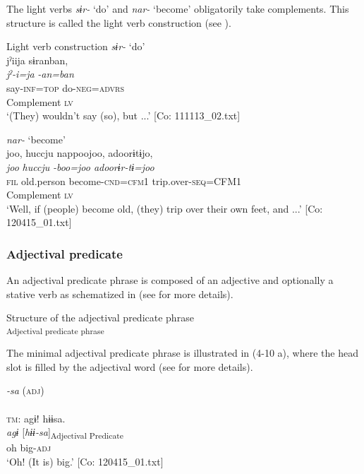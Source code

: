 The light verbs \textit{sɨr-} ‘do’ and \textit{nar-} ‘become’ obligatorily take complements. This structure is called the light verb construction (see ).

\ea  Light verb construction \label{ex:4.8}
 \ea  \textit{sɨr-} ‘do’\\
    \glll jˀiija  sɨranban,\\
    \textit{jˀ-i=ja}  \textit{-an=ban}\\
    say-\textsc{inf}=\textsc{top}  do-\textsc{neg}=\textsc{advrs}\\
    Complement  \textsc{lv}\\
    \glt ‘(They) wouldn’t say (so), but ...’    [Co: 111113\_02.txt]

\ex\textit{nar-} ‘become’\\
\glll joo,  huccju  nappoojoo,  adoorɨtɨjo,\\
    \textit{joo}  \textit{huccju}  \textit{-boo=joo  adoorɨr-tɨ=joo}\\
    \textsc{fil}  old.person  become-\textsc{cnd}=\textsc{cfm}1  trip.over-\textsc{seq}=CFM1\\
      Complement  \textsc{lv}  \\
    \glt ‘Well, if (people) become old, (they) trip over their own feet, and ...’     [Co: 120415\_01.txt]
    \z
\z

\subsubsection{Adjectival predicate}\label{sec:4.1.3.2}

An adjectival predicate phrase is composed of an adjective and optionally a stative verb as schematized in  (see  for more details).

\ea  Structure of the adjectival predicate phrase \label{ex:4.9}\\\textsubscript{Adjectival predicate phrase}
\z

The minimal adjectival predicate phrase is illustrated in (4-10 a), where the head slot is filled by the adjectival word (see  for more details).

\ea   \label{ex:4.10}
\ea \textit{{}-sa} (\textsc{adj}) \label{ex:4.10a}\\\\
\glll  \textsc{tm}:  agɨ!  hɨɨsa.\\
    \textit{agɨ}  [\textit{hɨɨ-sa}]\textsubscript{Adjectival Predicate}\\
    oh  big-\textsc{adj}\\
    \glt     ‘Oh! (It is) big.’ [Co: 120415\_01.txt]

